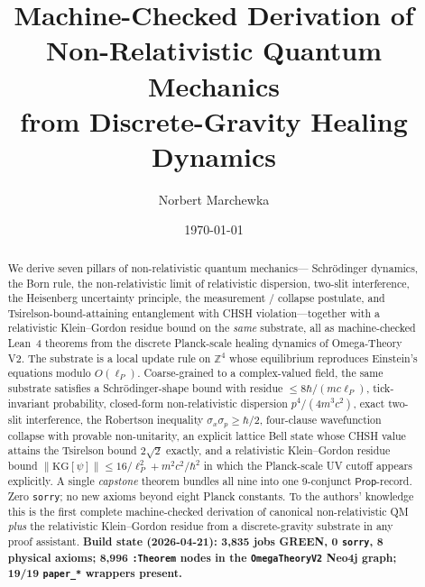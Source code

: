 \documentclass[aps,prl,twocolumn,superscriptaddress,nofootinbib,10pt]{revtex4-2}
\newcommand{\lP}{\ell_P}
\begin{document}
\title{Machine-Checked Derivation of Non-Relativistic Quantum Mechanics\\
  from Discrete-Gravity Healing Dynamics}

\author{Norbert Marchewka}

\date{\today}

\begin{abstract}
We derive seven pillars of non-relativistic quantum mechanics---
Schr\"odinger dynamics, the Born rule, the non-relativistic limit of
relativistic dispersion, two-slit interference, the Heisenberg
uncertainty principle, the measurement / collapse postulate, and
Tsirelson-bound-attaining entanglement with CHSH violation---together
with a relativistic Klein--Gordon residue bound on the \emph{same}
substrate, all as machine-checked Lean~4 theorems from the discrete
Planck-scale healing dynamics of Omega-Theory V2. The substrate is a
local update rule on $\mathbb{Z}^{4}$ whose equilibrium reproduces
Einstein's equations modulo $O(\lP)$. Coarse-grained to a
complex-valued field, the same substrate satisfies a
Schr\"odinger-shape bound with residue $\le 8\hbar/(mc\lP)$,
tick-invariant probability, closed-form non-relativistic dispersion
$p^{4}/(4m^{3}c^{2})$, exact two-slit interference, the Robertson
inequality $\sigma_{x}\sigma_{p}\ge\hbar/2$, four-clause wavefunction
collapse with provable non-unitarity, an explicit lattice Bell state
whose CHSH value attains the Tsirelson bound $2\sqrt{2}$ exactly, and
a relativistic Klein--Gordon residue bound
$\|\mathrm{KG}[\psi]\| \le 16/\lP^{2} + m^{2}c^{2}/\hbar^{2}$ in which
the Planck-scale UV cutoff appears explicitly. A single
\emph{capstone} theorem bundles all nine into one 9-conjunct
$\mathsf{Prop}$-record. Zero \texttt{sorry}; no new axioms beyond
eight Planck constants. To the authors' knowledge this is the first
complete machine-checked derivation of canonical non-relativistic QM
\emph{plus} the relativistic Klein--Gordon residue from a
discrete-gravity substrate in any proof assistant. \textbf{Build state
(2026-04-21): 3{,}835 jobs GREEN, 0 \texttt{sorry}, 8 physical axioms;
8{,}996 \texttt{:Theorem} nodes in the \texttt{OmegaTheoryV2} Neo4j
graph; 19/19 \texttt{paper\_*} wrappers present.}
\end{abstract}

\maketitle
\end{document}
